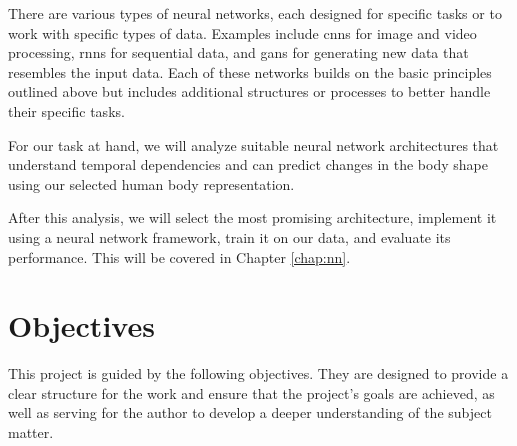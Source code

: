 There are various types of neural networks, each designed for specific tasks or
to work with specific types of data. Examples include \glspl{cnn} for image and
video processing, \glspl{rnn} for sequential data, and \glspl{gan} for
generating new data that resembles the input data. Each of these networks
builds on the basic principles outlined above but includes additional
structures or processes to better handle their specific tasks.

For our task at hand, we will analyze suitable neural network architectures
that understand temporal dependencies and can predict changes in the body shape
using our selected human body representation.

After this analysis, we will select the most promising architecture, implement
it using a neural network framework, train it on our data, and evaluate its
performance. This will be covered in Chapter \ref{chap:nn}.

\section{Objectives}\label{objectives}

This project is guided by the following objectives. They are designed to
provide a clear structure for the work and ensure that the project's goals are
achieved, as well as serving for the author to develop a deeper understanding
of the subject matter.

